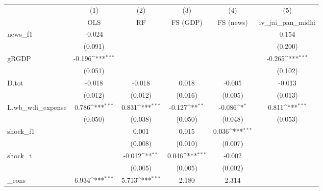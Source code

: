 {
\def\sym#1{\ifmmode^{#1}\else\(^{#1}\)\fi}
\begin{tabular}{l*{5}{c}}
\toprule
            &\multicolumn{1}{c}{(1)}&\multicolumn{1}{c}{(2)}&\multicolumn{1}{c}{(3)}&\multicolumn{1}{c}{(4)}&\multicolumn{1}{c}{(5)}\\
            &\multicolumn{1}{c}{OLS}&\multicolumn{1}{c}{RF}&\multicolumn{1}{c}{FS (GDP)}&\multicolumn{1}{c}{FS (news)}&\multicolumn{1}{c}{iv\_jai\_pan\_midhi}\\
\midrule
news\_f1     &      -0.024         &                     &                     &                     &       0.154         \\
            &     (0.091)         &                     &                     &                     &     (0.200)         \\
\addlinespace
gRGDP       &      -0.196\sym{***}&                     &                     &                     &      -0.265\sym{***}\\
            &     (0.051)         &                     &                     &                     &     (0.102)         \\
\addlinespace
D.tot       &      -0.018         &      -0.018         &       0.018         &      -0.005         &      -0.013         \\
            &     (0.012)         &     (0.012)         &     (0.016)         &     (0.005)         &     (0.013)         \\
\addlinespace
L.wb\_wdi\_expense&       0.786\sym{***}&       0.831\sym{***}&      -0.127\sym{**} &      -0.086\sym{*}  &       0.811\sym{***}\\
            &     (0.050)         &     (0.038)         &     (0.050)         &     (0.048)         &     (0.053)         \\
\addlinespace
shock\_f1    &                     &       0.001         &       0.015         &       0.036\sym{***}&                     \\
            &                     &     (0.008)         &     (0.010)         &     (0.007)         &                     \\
\addlinespace
shock\_t     &                     &      -0.012\sym{**} &       0.046\sym{***}&      -0.002         &                     \\
            &                     &     (0.005)         &     (0.005)         &     (0.002)         &                     \\
\addlinespace
\_cons      &       6.934\sym{***}&       5.713\sym{***}&       2.180         &       2.314         &                     \\

\end{tabular}}
